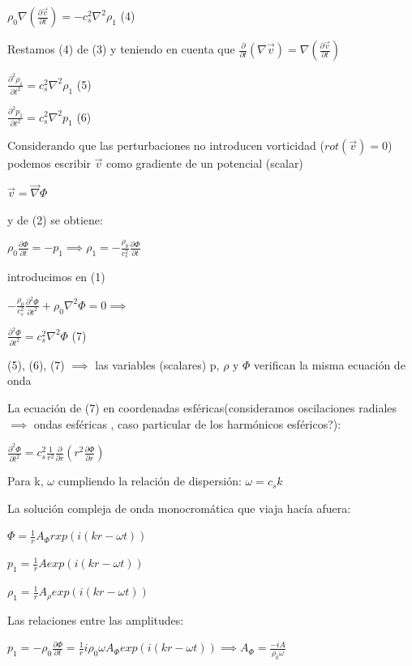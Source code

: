 \documentclass[10pt]{book}
\begin{document}
$\rho_0 \nabla(\frac{\partial \vec{v}}{\partial t}) = -c_s^2 \nabla^2 \rho_1$ (4)

Restamos (4) de (3) y teniendo en cuenta que $\frac{\partial}{\partial t}(\nabla \vec{v}) = \nabla(\frac{\partial \vec{v}}{\partial t})$ 

$\frac{\partial^2 \rho_1}{\partial t^2} = c_s^2 \nabla^2 \rho_1$ (5)

$\frac{\partial^2 p_1}{\partial t^2} = c_s^2 \nabla^2 p_1$  (6)

Considerando que las perturbaciones no introducen vorticidad ($rot(\vec{v}) = 0$) podemos escribir $\vec{v}$ como gradiente de un potencial (scalar)

$\vec{v} = \vec{\nabla} \Phi$
 
y de (2) se obtiene:

$\rho_0 \frac{\partial \Phi}{\partial t} = - p_1 \implies \rho_1 = -\frac{\rho_0}{c_s^2} \frac{\partial \Phi}{\partial t}$

introducimos en (1)

$-\frac{\rho_0}{c_s^2} \frac{\partial^2 \Phi}{\partial t^2} + \rho_0 \nabla^2 \Phi  = 0 \implies $

$\frac{\partial^2 \Phi}{\partial t^2} = c_s^2  \nabla^2 \Phi $ (7)

(5), (6), (7) $\implies$ las variables (scalares) p, $\rho$ y $\Phi$ verifican la misma ecuación de onda


La ecuación de (7) en coordenadas esféricas(consideramos oscilaciones radiales $\implies$ ondas esféricas , caso particular de los harmónicos esféricos?):

$\frac{\partial^2 \Phi}{\partial t^2} = c_s^2  \frac{1}{r^2} \frac{\partial}{\partial r} (r^2 \frac{\partial \Phi}{\partial r})   $ 

Para k, $\omega$ cumpliendo la relación de dispersión: $\omega = c_s  k$


La solución  compleja de  onda monocromática que viaja hacía afuera:


$\Phi = \frac{1}{r} A_{\Phi}rxp(i(kr-\omega t)) $

$p_1 = \frac{1}{r} A exp(i(kr-\omega t)) $

$\rho_1 = \frac{1}{r} A_{\rho} exp(i(kr-\omega t)) $

Las relaciones entre las amplitudes:

$p_1 = -\rho_0 \frac{\partial \Phi}{\partial t}  = \frac{1}{r} i \rho_0 \omega A_{\Phi} exp(i(kr-\omega t)) \implies A_{\Phi} = \frac{-i A}{\rho_0 \omega }$
\end{document}
